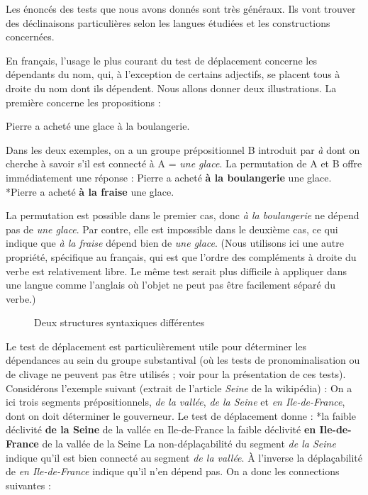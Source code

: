 Les énoncés des tests que nous avons donnés sont très généraux. Ils vont trouver des déclinaisons particulières selon les langues étudiées et les constructions concernées.

En français, l’usage le plus courant du test de déplacement concerne les dépendants du nom, qui, à l’exception de certains adjectifs, se placent tous à droite du nom dont ils dépendent. Nous allons donner deux illustrations. La première concerne les propositions :

\ea
    {Pierre a acheté une glace à la boulangerie.}
\z
{}
\z

Dans les deux exemples, on a un groupe prépositionnel B introduit par \textit{à} dont on cherche à savoir s’il est connecté à A = \textit{une glace}. La permutation de A et B offre immédiatement une réponse :
\ea
    {Pierre a acheté} \textbf{{à la boulangerie}}  {une glace.}
\z
\ea
    *{Pierre a acheté} \textbf{{à la fraise}}  {une glace.}
\z

La permutation est possible dans le premier cas, donc \textit{à la boulangerie} ne dépend pas de \textit{une glace}. Par contre, elle est impossible dans le deuxième cas, ce qui indique que \textit{à la fraise} dépend bien de \textit{une glace}. (Nous utilisons ici une autre propriété, spécifique au français, qui est que l’ordre des compléments à droite du verbe est relativement libre. Le même test serait plus difficile à appliquer dans une langue comme l’anglais où l’objet ne peut pas être facilement séparé du verbe.)

\begin{figure}

\caption{\label{fig:}Deux structures syntaxiques différentes}
\end{figure}

Le test de déplacement est particulièrement utile pour déterminer les dépendances au sein du groupe substantival (où les tests de pronominalisation ou de clivage ne peuvent pas être utilisés ; voir  pour la présentation de ces tests). Considérons l’exemple suivant (extrait de l’article \textit{Seine} de la wikipédia) :
\z
On a ici trois segments prépositionnels, \textit{de la vallée}, \textit{de la Seine} et \textit{en Ile-de-France}, dont on doit déterminer le gouverneur. Le test de déplacement donne :
\ea
    *{la faible déclivité} \textbf{{de la Seine}}  {de la vallée en Ile-de-France}
\z
\ea
    {la faible déclivité} \textbf{{en Ile-de-France}}  {de la vallée de la Seine}
\z
La non-déplaçabilité du segment \textit{de la Seine} indique qu’il est bien connecté au segment \textit{de la vallée}. À l’inverse la déplaçabilité de \textit{en Ile-de-France} indique qu’il n’en dépend pas. On a donc les connections suivantes :


